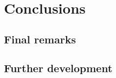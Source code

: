 \chapter{Conclusions} \label{roz:conclusion}

\section{Final remarks}

\section{Further development}